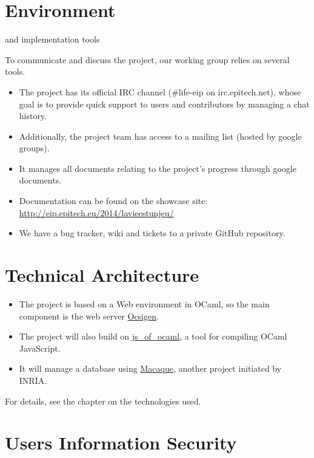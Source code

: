\documentclass {life-en}
\begin{document}
\section{Environment} and implementation tools

To communicate and discuss the project, our working group relies on several tools.

\begin{itemize}
  \item The project has its official IRC channel (\#life-eip on irc.epitech.net), whose goal is to provide quick support to users and contributors by managing a chat history.
  \item Additionally, the project team has access to a mailing list (hosted by google groups).
  \item It manages all documents relating to the project's progress through google documents.
  \item Documentation can be found on the showcase site: \url{http://eip.epitech.eu/2014/lavieestunjeu/}
  \item We have a bug tracker, wiki and tickets to a private GitHub repository.
\end{itemize}

\section{Technical Architecture}

\begin{itemize}
  \item The project is based on a Web environment in OCaml, so the main component is the web server
        \href{http://ocsigen.org/}{Ocsigen}.
  \item The project will also build on \href{http://ocsigen.org/js_of_ocaml/}{js\_of\_ocaml}, a tool for compiling OCaml JavaScript.
  \item It will manage a database using \href{http://ocsigen.org/macaque/}{Macaque}, another project initiated by INRIA.
\end{itemize}

For details, see the chapter on the technologies used.

\section{Users Information Security}
\end{document}
